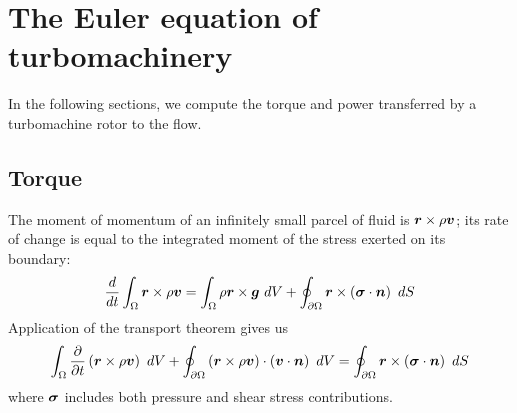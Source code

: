 
\section{The Euler equation of turbomachinery}

In the following sections, we compute the torque and power transferred
by a turbomachine rotor to the flow.

\subsection{Torque}

The moment of momentum of an infinitely small parcel of fluid is
$\boldsymbol {r} \times \rho \boldsymbol {v}$; its rate of change is equal to the
integrated moment of the stress exerted on its boundary:
\begin{align*}
  \frac{d}{dt} \int_{\Omega} \boldsymbol {r} \times \rho \boldsymbol {v} =  \int_{\Omega} \rho \boldsymbol {r} \times \boldsymbol {g}~dV +
  \oint_{{\partial \Omega}} \boldsymbol {r} \times \left(\boldsymbol {\sigma} \cdot \boldsymbol {n} \right)~dS
\end{align*}
Application of the transport theorem gives us 
\begin{equation}
  \int_\vol \ddt{} \left(\xyzV \times \dens \velV\right) ~dV +
  \oint_{\srf} \left(\xyzV \times \dens \velV\right) \cdot \left(\velV
    \cdot \nrmV\right)~dV = %
  \oint_{\srf} \xyzV \times \left(\stressT \cdot \nrmV \right)~dS
  \label{eq:momentOfMomentum}
\end{equation}
where $\boldsymbol {\sigma}$ includes both pressure and shear stress
contributions.

